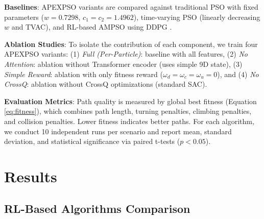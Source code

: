 \documentclass[fleqn,10pt]{wlscirep}
\begin{document}
\textbf{Baselines}: APEXPSO variants are compared against traditional PSO with fixed parameters ($w=0.7298$, $c_1=c_2=1.4962$), time-varying PSO (linearly decreasing $w$ and TVAC), and RL-based AMPSO using DDPG \cite{yin2023rlam}.

\textbf{Ablation Studies}: To isolate the contribution of each component, we train four APEXPSO variants: (1) \textit{Full (Per-Particle)}: baseline with all features, (2) \textit{No Attention}: ablation without Transformer encoder (uses simple 9D state), (3) \textit{Simple Reward}: ablation with only fitness reward ($\omega_d = \omega_c = \omega_u = 0$), and (4) \textit{No CrossQ}: ablation without CrossQ optimizations (standard SAC).

\textbf{Evaluation Metrics}: Path quality is measured by global best fitness (Equation \ref{eq:fitness}), which combines path length, turning penalties, climbing penalties, and collision penalties. Lower fitness indicates better paths. For each algorithm, we conduct 10 independent runs per scenario and report mean, standard deviation, and statistical significance via paired t-tests ($p < 0.05$).

\section*{Results}
\label{sec:results}

\subsection*{RL-Based Algorithms Comparison}
\end{document}
